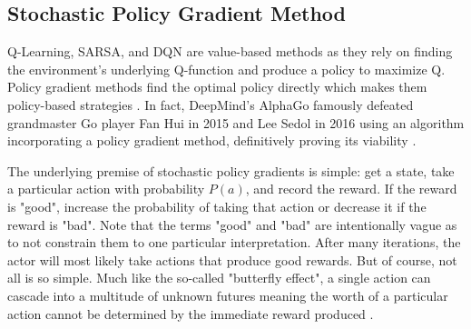 \subsection{Stochastic Policy Gradient Method}
Q-Learning, SARSA, and DQN are value-based methods as they rely on finding the environment's underlying Q-function and produce a policy to maximize Q. Policy gradient methods find the optimal policy directly which makes them policy-based strategies \cite{sutton_policygrad}. In fact, DeepMind's AlphaGo famously defeated grandmaster Go player Fan Hui in 2015 and Lee Sedol in 2016 using an algorithm incorporating a policy gradient method, definitively proving its viability \cite{silver_2017}.

The underlying premise of stochastic policy gradients is simple: get a state, take a particular action with probability $P(a)$, and record the reward. If the reward is "good", increase the probability of taking that action or decrease it if the reward is "bad". Note that the terms "good" and "bad" are intentionally vague as to not constrain them to one particular interpretation. After many iterations, the actor will most likely take actions that produce good rewards. But of course, not all is so simple. Much like the so-called "butterfly effect", a single action can cascade into a multitude of unknown futures meaning the worth of a particular action cannot be determined by the immediate reward produced \cite{Lorenz_1963}. 

